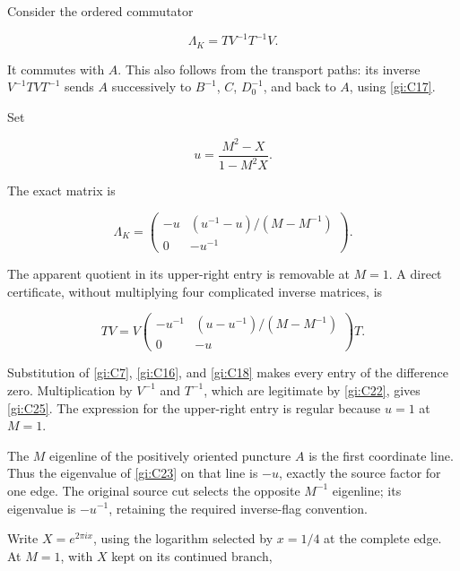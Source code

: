 Consider the ordered commutator

\begin{equation}\label{gi:C23}
\Lambda_K=T V^{-1}T^{-1}V.
\end{equation}

It commutes with \(A\). This also follows from the transport paths: its inverse \(V^{-1}TVT^{-1}\) sends \(A\) successively to \(B^{-1}\), \(C\), \(D_0^{-1}\), and back to \(A\), using \eqref{gi:C17}.

Set

\begin{equation}\label{gi:C24}
u=\frac{M^2-X}{1-M^2X}.
\end{equation}

The exact matrix is

\begin{equation}\label{gi:C25}
\Lambda_K=
 \begin{pmatrix}
 -u & (u^{-1}-u)/(M-M^{-1})\\
 0  & -u^{-1}
 \end{pmatrix}.
\end{equation}

The apparent quotient in its upper-right entry is removable at \(M=1\). A direct certificate, without multiplying four complicated inverse matrices, is

\begin{equation}\label{gi:C26}
T V=V
 \begin{pmatrix}
 -u^{-1}&(u-u^{-1})/(M-M^{-1})\\
 0&-u
 \end{pmatrix}T.
\end{equation}

Substitution of \eqref{gi:C7}, \eqref{gi:C16}, and \eqref{gi:C18} makes every entry of the difference zero. Multiplication by \(V^{-1}\) and \(T^{-1}\), which are legitimate by \eqref{gi:C22}, gives \eqref{gi:C25}. The expression for the upper-right entry is regular because \(u=1\) at \(M=1\).

The \(M\) eigenline of the positively oriented puncture \(A\) is the first coordinate line. Thus the eigenvalue of \eqref{gi:C23} on that line is \(-u\), exactly the source factor for one edge. The original source cut selects the opposite \(M^{-1}\) eigenline; its eigenvalue is \(-u^{-1}\), retaining the required inverse-flag convention.

Write \(X=e^{2\pi i x}\), using the logarithm selected by \(x=1/4\)
at the complete edge. At \(M=1\), with \(X\) kept on its continued branch,

